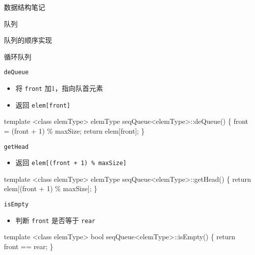 \documentclass[
  ignorenonframetext,
]{beamer}
\newenvironment{Shaded}{}{}
\newcommand{\NormalTok}[1]{#1}
\providecommand{\tightlist}{%
  \setlength{\itemsep}{0pt}\setlength{\parskip}{0pt}}
\begin{document}
\begin{frame}[fragile]{数据结构笔记}
\begin{block}{队列}
\begin{block}{队列的顺序实现}
\begin{block}{循环队列}
\begin{block}{\texttt{deQueue}}
\protect{}\label{dequeue}
\begin{itemize}
\tightlist
\item
  将 \texttt{front} 加1，指向队首元素
\item
  返回 \texttt{elem{[}front{]}}
\end{itemize}

\begin{Shaded}
\begin{Highlighting}[]
\NormalTok{template \textless{}class elemType\textgreater{}}
\NormalTok{elemType seqQueue\textless{}elemType\textgreater{}::deQueue()}
\NormalTok{\{}
\NormalTok{  front = (front + 1) \% maxSize;}
\NormalTok{  return elem[front];}
\NormalTok{\}}
\end{Highlighting}
\end{Shaded}
\end{block}

\begin{block}{\texttt{getHead}}
\protect{}\label{gethead}
\begin{itemize}
\tightlist
\item
  返回 \texttt{elem{[}(front\ +\ 1)\ \%\ maxSize{]}}
\end{itemize}

\begin{Shaded}
\begin{Highlighting}[]
\NormalTok{template \textless{}class elemType\textgreater{}}
\NormalTok{elemType seqQueue\textless{}elemType\textgreater{}::getHead()}
\NormalTok{\{}
\NormalTok{  return elem[(front + 1) \% maxSize];}
\NormalTok{\}}
\end{Highlighting}
\end{Shaded}
\end{block}

\begin{block}{\texttt{isEmpty}}
\protect{}\label{isempty-2}
\begin{itemize}
\tightlist
\item
  判断 \texttt{front} 是否等于 \texttt{rear}
\end{itemize}

\begin{Shaded}
\begin{Highlighting}[]
\NormalTok{template \textless{}class elemType\textgreater{}}
\NormalTok{bool seqQueue\textless{}elemType\textgreater{}::isEmpty()}
\NormalTok{\{}
\NormalTok{  return front == rear;}
\NormalTok{\}}
\end{Highlighting}
\end{Shaded}
\end{block}
\end{block}
\end{block}


\end{block}
\end{frame}
\end{document}
